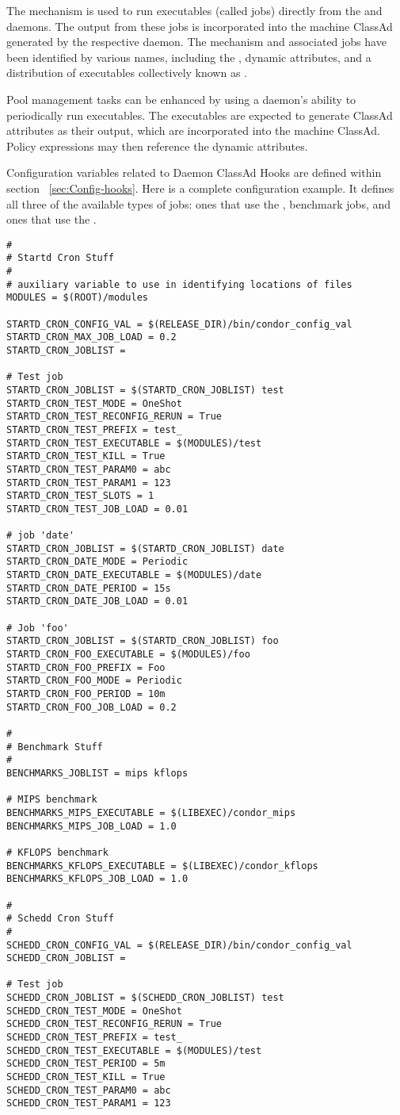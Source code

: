 The  mechanism is
used to run executables (called jobs) directly from the
 and  daemons. 
The output from these jobs is incorporated into the machine ClassAd
generated by the respective daemon.
The mechanism and associated jobs have been identified by various
names, including the , dynamic attributes,
and a distribution of executables collectively known as .

Pool management tasks can be enhanced by using a 
daemon's ability to periodically run executables.
The executables are expected to generate ClassAd attributes as their output,
which are incorporated into the machine ClassAd.
Policy expressions may then reference the dynamic attributes.

Configuration variables related to Daemon ClassAd Hooks are defined
within section ~\ref{sec:Config-hooks}.
Here is a complete configuration example.
It defines all three of the available types of jobs:
ones that use the , benchmark jobs,
and ones that use the .
\footnotesize
\begin{verbatim}
#
# Startd Cron Stuff
#
# auxiliary variable to use in identifying locations of files
MODULES = $(ROOT)/modules

STARTD_CRON_CONFIG_VAL = $(RELEASE_DIR)/bin/condor_config_val
STARTD_CRON_MAX_JOB_LOAD = 0.2
STARTD_CRON_JOBLIST =

# Test job
STARTD_CRON_JOBLIST = $(STARTD_CRON_JOBLIST) test
STARTD_CRON_TEST_MODE = OneShot
STARTD_CRON_TEST_RECONFIG_RERUN = True
STARTD_CRON_TEST_PREFIX = test_
STARTD_CRON_TEST_EXECUTABLE = $(MODULES)/test
STARTD_CRON_TEST_KILL = True
STARTD_CRON_TEST_PARAM0 = abc
STARTD_CRON_TEST_PARAM1 = 123
STARTD_CRON_TEST_SLOTS = 1
STARTD_CRON_TEST_JOB_LOAD = 0.01

# job 'date'
STARTD_CRON_JOBLIST = $(STARTD_CRON_JOBLIST) date
STARTD_CRON_DATE_MODE = Periodic
STARTD_CRON_DATE_EXECUTABLE = $(MODULES)/date
STARTD_CRON_DATE_PERIOD = 15s
STARTD_CRON_DATE_JOB_LOAD = 0.01

# Job 'foo'
STARTD_CRON_JOBLIST = $(STARTD_CRON_JOBLIST) foo
STARTD_CRON_FOO_EXECUTABLE = $(MODULES)/foo
STARTD_CRON_FOO_PREFIX = Foo
STARTD_CRON_FOO_MODE = Periodic
STARTD_CRON_FOO_PERIOD = 10m
STARTD_CRON_FOO_JOB_LOAD = 0.2

#
# Benchmark Stuff
#
BENCHMARKS_JOBLIST = mips kflops

# MIPS benchmark
BENCHMARKS_MIPS_EXECUTABLE = $(LIBEXEC)/condor_mips
BENCHMARKS_MIPS_JOB_LOAD = 1.0

# KFLOPS benchmark
BENCHMARKS_KFLOPS_EXECUTABLE = $(LIBEXEC)/condor_kflops
BENCHMARKS_KFLOPS_JOB_LOAD = 1.0

#
# Schedd Cron Stuff 
#
SCHEDD_CRON_CONFIG_VAL = $(RELEASE_DIR)/bin/condor_config_val
SCHEDD_CRON_JOBLIST =

# Test job
SCHEDD_CRON_JOBLIST = $(SCHEDD_CRON_JOBLIST) test
SCHEDD_CRON_TEST_MODE = OneShot
SCHEDD_CRON_TEST_RECONFIG_RERUN = True
SCHEDD_CRON_TEST_PREFIX = test_
SCHEDD_CRON_TEST_EXECUTABLE = $(MODULES)/test
SCHEDD_CRON_TEST_PERIOD = 5m
SCHEDD_CRON_TEST_KILL = True
SCHEDD_CRON_TEST_PARAM0 = abc
SCHEDD_CRON_TEST_PARAM1 = 123

\end{verbatim}
\normalsize

